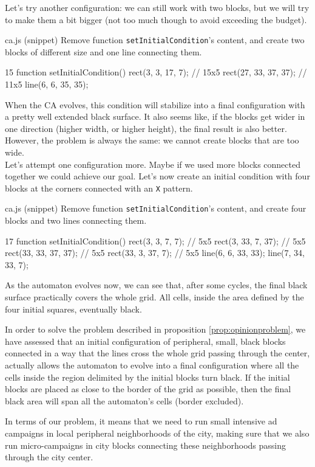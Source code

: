 Let's try another configuration: we can still work with two blocks, but we will try to make them a
bit bigger (not too much though to avoid exceeding the budget).

\begin{programcode}{ca.js (snippet)}
Remove function \texttt{setInitialCondition}'s content, and create two blocks of different size and one
line connecting them.
\begin{codeh1}{1}{5}
function setInitialCondition() {
  rect(3, 3, 17, 7); // 15x5
  rect(27, 33, 37, 37); // 11x5
  line(6, 6, 35, 35);
}
\end{codeh1}
\end{programcode}

When the CA evolves, this condition will stabilize into a final configuration with a pretty well
extended black surface. It also seems like, if the blocks get wider in one direction
(higher width, or higher height), the final result is also better. However, the problem is always the same:
we cannot create blocks that are too wide.\\

Let's attempt one configuration more. Maybe if we used more blocks connected together we could achieve
our goal. Let's now create an initial condition with four blocks at the corners connected with
an \texttt{X} pattern.

\begin{programcode}{ca.js (snippet)}
Remove function \texttt{setInitialCondition}'s content, and create four blocks and two
lines connecting them.
\begin{codeh1}{1}{7}
function setInitialCondition() {
  rect(3, 3, 7, 7); // 5x5
  rect(3, 33, 7, 37); // 5x5
  rect(33, 33, 37, 37); // 5x5
  rect(33, 3, 37, 7); // 5x5
  line(6, 6, 33, 33);
  line(7, 34, 33, 7);
}
\end{codeh1}
\end{programcode}

As the automaton evolves now, we can see that, after some cycles, the final black surface practically covers the whole
grid. All cells, inside the area defined by the four initial squares, eventually black.

\begin{proposition}
\label{prop:sol}
In order to solve the problem described in proposition \ref{prop:opinionproblem}, we have assessed that an
initial configuration of peripheral, small, black blocks connected in a way that the lines cross the whole grid
passing through the center, actually allows the automaton to evolve into a final configuration where all the cells
inside the region delimited by the initial blocks turn black. If the initial blocks are placed as close to the border
of the grid as possible, then the final black area will span all the automaton's cells (border excluded).

In terms of our problem, it means that we need to run small intensive ad campaigns in local peripheral neighborhoods
of the city, making sure that we also run micro-campaigns in city blocks connecting these neighborhoods passing through
the city center.
\end{proposition}

